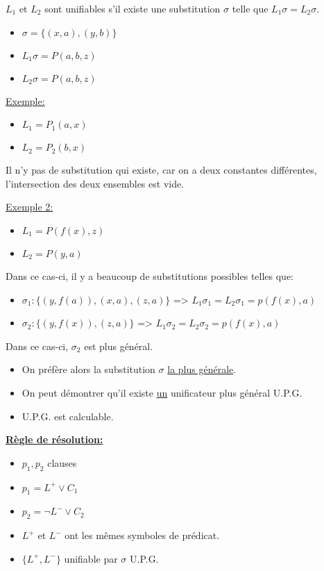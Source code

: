 \vspace{5 mm}
$L_1$ et $L_2$ sont unifiables s'il existe une substitution $\sigma$ telle que $L_1 \sigma = L_2 \sigma$.
\begin{itemize}
  \item $\sigma = \big\{(x,a),(y,b)\big\}$
  \item $L_1 \sigma = P(a,b,z)$
  \item $L_2 \sigma = P(a,b,z)$
\end{itemize}

\vspace{5 mm}
\underline{Exemple:}
\begin{itemize}
  \item $L_1 = P_1(a,x)$
  \item $L_2 = P_2(b,x)$
\end{itemize}

Il n'y pas de substitution qui existe, car on a deux constantes différentes, l'intersection des deux ensembles est vide.
\smallskip

\underline{Exemple 2:}

\begin{itemize}
  \item $L_1 = P(f(x), z)$ 
  \item $L_2 = P(y, a)$
\end{itemize}

Dans ce cas-ci, il y a beaucoup de substitutions possibles telles que:
\begin{itemize}
  \item $\sigma_1 : \big\{ (y, f(a)), (x,a), (z,a) \big\}$ => $L_1 \sigma_1 = L_2 \sigma_1 = p(f(x), a)$
  \item $\sigma_2 : \big\{ (y, f(x)), (z,a) \big\}$ \hspace{11 mm}=> $L_1 \sigma_2 = L_2 \sigma_2 = p(f(x), a)$
\end{itemize}
Dans ce cas-ci, $\sigma_2$ est plus général.\\

\smallskip
\begin{itemize}
  \item On préfère alors la substitution $\sigma$ \underline{la plus générale}.
  \item On peut démontrer qu'il existe \underline{un} unificateur plus général U.P.G.
  \item U.P.G. est calculable.
\end{itemize}

\vspace{5 mm}
\textbf{\underline{Règle de résolution:}}
\begin{itemize}
  \item $p_1, p_2$ clauses
  \item $p_1 = L^{+} \vee C_1$
  \item $p_2 = \neg L^{-} \vee C_2$
  \item $ L^{+}$ et $L^{-}$ ont les mêmes symboles de prédicat.
  \item $ \big\{L^{+}, L^{-}\big\}$ unifiable par $\sigma$ U.P.G.
\end{itemize}

